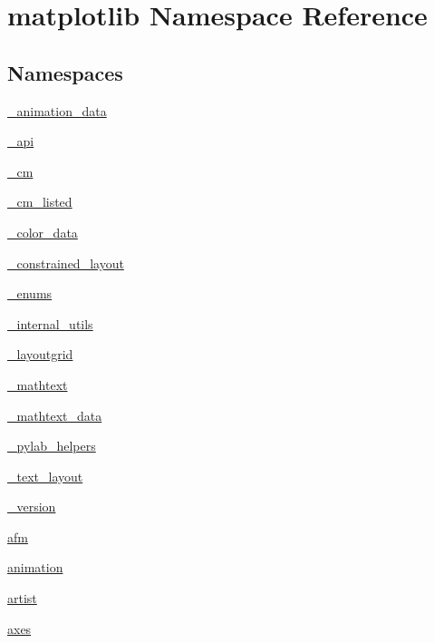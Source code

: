 \hypertarget{namespacematplotlib}{}\section{matplotlib Namespace Reference}
\label{namespacematplotlib}
\subsection*{Namespaces}
\begin{DoxyCompactItemize}
\item 
 \hyperlink{namespacematplotlib_1_1__animation__data}{\+\_\+animation\+\_\+data}
\item 
 \hyperlink{namespacematplotlib_1_1__api}{\+\_\+api}
\item 
 \hyperlink{namespacematplotlib_1_1__cm}{\+\_\+cm}
\item 
 \hyperlink{namespacematplotlib_1_1__cm__listed}{\+\_\+cm\+\_\+listed}
\item 
 \hyperlink{namespacematplotlib_1_1__color__data}{\+\_\+color\+\_\+data}
\item 
 \hyperlink{namespacematplotlib_1_1__constrained__layout}{\+\_\+constrained\+\_\+layout}
\item 
 \hyperlink{namespacematplotlib_1_1__enums}{\+\_\+enums}
\item 
 \hyperlink{namespacematplotlib_1_1__internal__utils}{\+\_\+internal\+\_\+utils}
\item 
 \hyperlink{namespacematplotlib_1_1__layoutgrid}{\+\_\+layoutgrid}
\item 
 \hyperlink{namespacematplotlib_1_1__mathtext}{\+\_\+mathtext}
\item 
 \hyperlink{namespacematplotlib_1_1__mathtext__data}{\+\_\+mathtext\+\_\+data}
\item 
 \hyperlink{namespacematplotlib_1_1__pylab__helpers}{\+\_\+pylab\+\_\+helpers}
\item 
 \hyperlink{namespacematplotlib_1_1__text__layout}{\+\_\+text\+\_\+layout}
\item 
 \hyperlink{namespacematplotlib_1_1__version}{\+\_\+version}
\item 
 \hyperlink{namespacematplotlib_1_1afm}{afm}
\item 
 \hyperlink{namespacematplotlib_1_1animation}{animation}
\item 
 \hyperlink{namespacematplotlib_1_1artist}{artist}
\item 
 \hyperlink{namespacematplotlib_1_1axes}{axes}
\item 

\end{DoxyCompactItemize}

